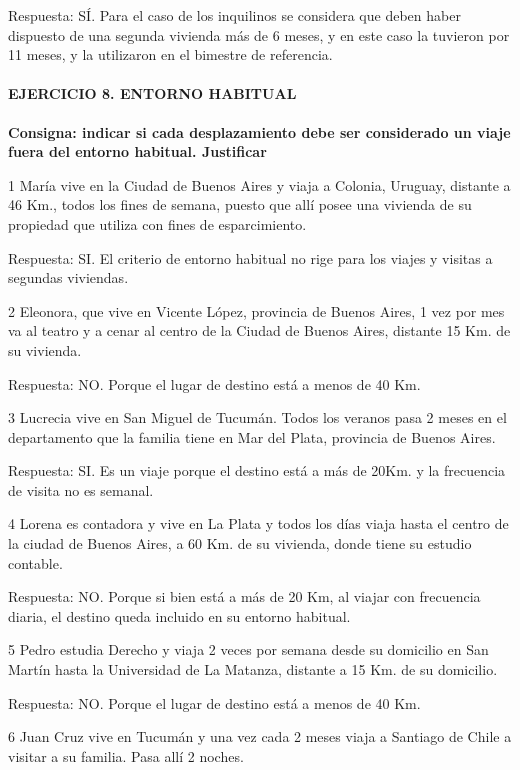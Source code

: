 \documentclass[
  openany]{book}
\begin{document}
Respuesta: SÍ. Para el caso de los inquilinos se considera que deben haber dispuesto de una segunda vivienda más de 6 meses, y en este caso la tuvieron por 11 meses, y la utilizaron en el bimestre de referencia.

\hypertarget{ejercicio-8.-entorno-habitual-1}{%
\paragraph{\texorpdfstring{\textbf{EJERCICIO 8. ENTORNO HABITUAL}}{EJERCICIO 8. ENTORNO HABITUAL}}\label{ejercicio-8.-entorno-habitual-1}}

\textbf{Consigna: indicar si cada desplazamiento debe ser considerado un viaje fuera del entorno habitual. Justificar}

1 María vive en la Ciudad de Buenos Aires y viaja a Colonia, Uruguay, distante a 46 Km., todos los fines de semana, puesto que allí posee una vivienda de su propiedad que utiliza con fines de esparcimiento.

Respuesta: SI. El criterio de entorno habitual no rige para los viajes y visitas a segundas viviendas.

2 Eleonora, que vive en Vicente López, provincia de Buenos Aires, 1 vez por mes va al teatro y a cenar al centro de la Ciudad de Buenos Aires, distante 15 Km. de su vivienda.

Respuesta: NO. Porque el lugar de destino está a menos de 40 Km.

3 Lucrecia vive en San Miguel de Tucumán. Todos los veranos pasa 2 meses en el departamento que la familia tiene en Mar del Plata, provincia de Buenos Aires.

Respuesta: SI. Es un viaje porque el destino está a más de 20Km. y la frecuencia de visita no es semanal.

4 Lorena es contadora y vive en La Plata y todos los días viaja hasta el centro de la ciudad de Buenos Aires, a 60 Km. de su vivienda, donde tiene su estudio contable.

Respuesta: NO. Porque si bien está a más de 20 Km, al viajar con frecuencia diaria, el destino queda incluido en su entorno habitual.

5 Pedro estudia Derecho y viaja 2 veces por semana desde su domicilio en San Martín hasta la Universidad de La Matanza, distante a 15 Km. de su domicilio.

Respuesta: NO. Porque el lugar de destino está a menos de 40 Km.

6 Juan Cruz vive en Tucumán y una vez cada 2 meses viaja a Santiago de Chile a visitar a su familia. Pasa allí 2 noches.
\end{document}
